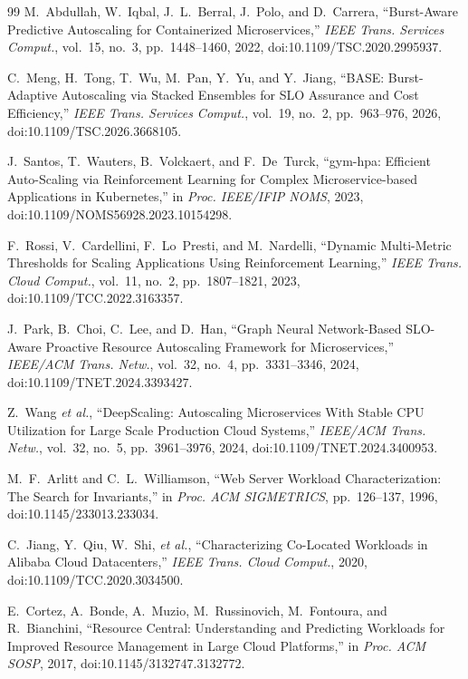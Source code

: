 \documentclass[journal]{IEEEtran}
\begin{document}
\begin{thebibliography}{99}
M.~Abdullah, W.~Iqbal, J.~L.~Berral, J.~Polo, and D.~Carrera, ``Burst-Aware Predictive Autoscaling for Containerized Microservices,'' \emph{IEEE Trans. Services Comput.}, vol.~15, no.~3, pp.~1448--1460, 2022, doi:10.1109/TSC.2020.2995937.

C.~Meng, H.~Tong, T.~Wu, M.~Pan, Y.~Yu, and Y.~Jiang, ``BASE: Burst-Adaptive Autoscaling via Stacked Ensembles for SLO Assurance and Cost Efficiency,'' \emph{IEEE Trans. Services Comput.}, vol.~19, no.~2, pp.~963--976, 2026, doi:10.1109/TSC.2026.3668105.

J.~Santos, T.~Wauters, B.~Volckaert, and F.~De~Turck, ``gym-hpa: Efficient Auto-Scaling via Reinforcement Learning for Complex Microservice-based Applications in Kubernetes,'' in \emph{Proc. IEEE/IFIP NOMS}, 2023, doi:10.1109/NOMS56928.2023.10154298.

F.~Rossi, V.~Cardellini, F.~Lo~Presti, and M.~Nardelli, ``Dynamic Multi-Metric Thresholds for Scaling Applications Using Reinforcement Learning,'' \emph{IEEE Trans. Cloud Comput.}, vol.~11, no.~2, pp.~1807--1821, 2023, doi:10.1109/TCC.2022.3163357.

J.~Park, B.~Choi, C.~Lee, and D.~Han, ``Graph Neural Network-Based SLO-Aware Proactive Resource Autoscaling Framework for Microservices,'' \emph{IEEE/ACM Trans. Netw.}, vol.~32, no.~4, pp.~3331--3346, 2024, doi:10.1109/TNET.2024.3393427.

Z.~Wang \emph{et al.}, ``DeepScaling: Autoscaling Microservices With Stable CPU Utilization for Large Scale Production Cloud Systems,'' \emph{IEEE/ACM Trans. Netw.}, vol.~32, no.~5, pp.~3961--3976, 2024, doi:10.1109/TNET.2024.3400953.

M.~F.~Arlitt and C.~L.~Williamson, ``Web Server Workload Characterization: The Search for Invariants,'' in \emph{Proc. ACM SIGMETRICS}, pp.~126--137, 1996, doi:10.1145/233013.233034.

C.~Jiang, Y.~Qiu, W.~Shi, \emph{et al.}, ``Characterizing Co-Located Workloads in Alibaba Cloud Datacenters,'' \emph{IEEE Trans. Cloud Comput.}, 2020, doi:10.1109/TCC.2020.3034500.

E.~Cortez, A.~Bonde, A.~Muzio, M.~Russinovich, M.~Fontoura, and R.~Bianchini, ``Resource Central: Understanding and Predicting Workloads for Improved Resource Management in Large Cloud Platforms,'' in \emph{Proc. ACM SOSP}, 2017, doi:10.1145/3132747.3132772.


\end{thebibliography}
\end{document}
